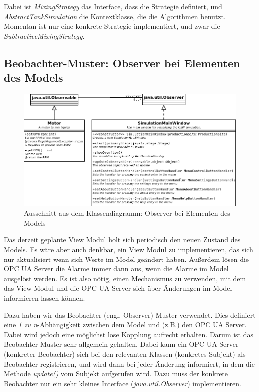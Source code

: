 \documentclass[parskip=full]{scrartcl}
\begin{document}
Dabei ist \emph{MixingStrategy} das Interface, dass die Strategie definiert, und \emph{AbstractTankSimulation} die Kontextklasse, die die Algorithmen
benutzt. Momentan ist nur eine konkrete Strategie implementiert, und zwar die \emph{SubtractiveMixingStrategy}.

\pagebreak
\subsection{Beobachter-Muster: Observer bei Elementen des Models}
\begin{figure}[H]
  \centering
  \includegraphics[scale=0.35]{design/pattern-screenshots/observer-Model.png}
  \caption{Ausschnitt aus dem Klassendiagramm: Observer bei Elementen des Models}
\end{figure}
Das derzeit geplante View Modul holt sich periodisch den neuen Zustand des Models. Es wäre aber auch denkbar, ein View Modul zu implementieren,
das sich nur aktualisiert wenn sich Werte im Model geändert haben. Außerdem lösen die OPC UA Server die Alarme immer dann aus, wenn die Alarme im Model
ausgelöst werden. Es ist also nötig, einen Mechanismus zu verwenden, mit dem das View-Modul und die OPC UA Server sich über Änderungen im Model informieren
lassen können.

Dazu haben wir das Beobachter (engl. Observer) Muster verwendet. Dies definiert eine \emph{1 zu n}-Abhängigkeit zwischen dem Model und (z.B.) den OPC UA Server.
Dabei wird jedoch eine möglichst lose Kopplung aufrecht erhalten. Darum ist das Beobachter Muster sehr allgemein gehalten. Dabei kann ein OPC UA Server (konkreter Beobachter)
sich bei den relevanten Klassen (konkretes Subjekt) als Beobachter registrieren, und wird dann bei jeder Änderung informiert, in dem die Methode \emph{update()}
vom Subjekt aufgerufen wird. Dazu muss der konkrete Beobachter nur ein sehr kleines Interface (\emph{java.util.Observer}) implementieren.
\end{document}
